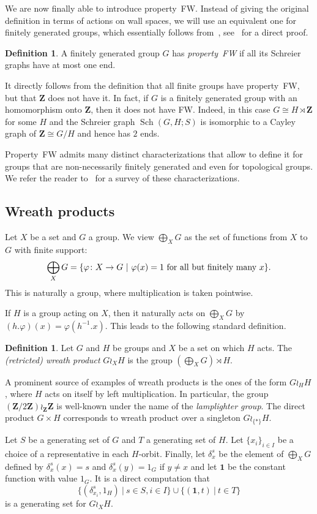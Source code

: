 \documentclass[a4paper]{article}
\theoremstyle{definition}
\newtheorem{defn}[lem]{Definition}
\theoremstyle{remark}
\DeclareMathOperator\Sch{Sch}
\newcommand*{\field}[1]{\mathbf{#1}}
\newcommand*{\Z}{\field{Z}}
\newcommand{\setst}[2]{\{#1\ |\ #2\}}
\begin{document}
We are now finally able to introduce property~FW. Instead of giving the original definition in terms of actions on wall spaces, we will use an equivalent one for finitely generated groups, which essentially follows from~\cite{MR1347406}, see~\cite{Cornulier2013} for a direct proof.
%
%
\begin{defn}
A finitely generated group $G$ has \emph{property~FW} if all its Schreier graphs have at most one end.
\end{defn}
%
%
It directly follows from the definition that all finite groups have property~FW, but that $\Z$ does not have it.
In fact, if $G$ is a finitely generated group with an homomorphism onto $\Z$, then it does not have FW. Indeed, in this case $G\cong H\rtimes \Z$  for some $H$ and the Schreier graph $\Sch(G,H;S)$ is isomorphic to a Cayley graph of $\Z\cong G/H$ and hence has $2$ ends.

Property~FW admits many distinct characterizations that allow to define it for groups that are non-necessarily finitely generated and even for topological groups. We refer the reader to~\cite{Cornulier2013} for a survey of these characterizations.

\subsection{Wreath products}
%
%
Let $X$ be a set and $G$ a group. We view
$\bigoplus_XG$ as the set of functions from $X$ to $G$ with finite support:
\[
	\bigoplus_XG=\setst{\varphi\colon X\to G}{\varphi(x)=1 \textnormal{ for all but finitely many }x}.
\]
This is naturally a group, where multiplication is taken pointwise.

If $H$ is a group acting on $X$, then it naturally acts on $\bigoplus_XG$
by $(h.\varphi)(x)=\varphi(h^{-1}.x)$.
This leads to the following standard definition.
\begin{defn}\label{Def:WreathProd}
Let $G$ and $H$ be groups and $X$ be a set on which $H$ acts.
The \emph{(retricted) wreath product} $G\wr_XH$ is the group $(\bigoplus_XG)\rtimes H$.
\end{defn}
A prominent  source of examples of wreath products is the ones of the form $G\wr_HH$, where $H$ acts on itself by left multiplication.
In particular, the group $(\Z/2\Z)\wr_\Z\Z$ is well-known under the name of the \emph{lamplighter group}.
The direct product $G\times H$ corresponds to wreath product over a singleton $G\wr_{\{*\}}H$.

Let $S$ be a generating set of $G$ and $T$ a generating set of $H$.
Let $\{x_i\}_{i\in I}$ be a choice of a representative in each $H$-orbit.
Finally, let $\delta_x^s$ be the element of $\bigoplus_XG$ defined by $\delta_x^s(x)=s$ and $\delta_x^s(y)=1_G$ if $y\neq x$ and let $\mathbf 1$ be the constant function with value $1_G$.
It is a direct computation that
\[
	\setst{(\delta_{x_i}^s,1_H)}{s \in S,i\in I} \cup \setst{(\mathbf 1,t)}{t \in T}
\]
is a generating set for $G\wr_XH$.
\end{document}
